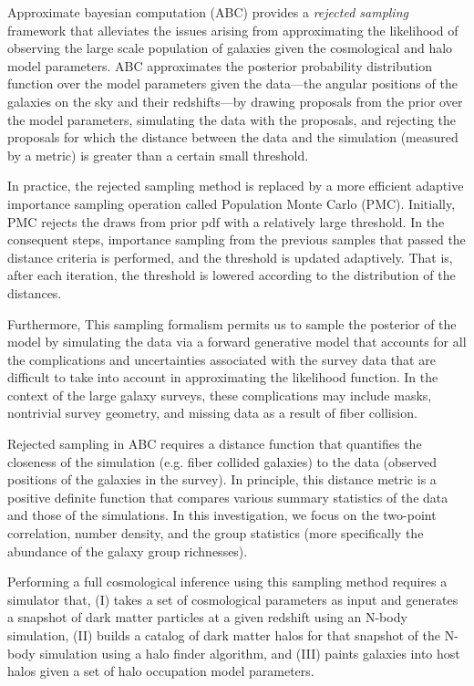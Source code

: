 \documentclass[12pt, preprint]{aastex}
\begin{document}
Approximate bayesian computation (ABC) provides a \emph{rejected sampling} framework that alleviates the issues arising from approximating the likelihood of observing the large scale population of galaxies given the cosmological and halo model parameters. ABC approximates the posterior probability distribution function over the model parameters given the data---the angular positions of the galaxies on the sky and their redshifts---by drawing proposals from the prior over the model parameters, simulating the data with the proposals, and rejecting the proposals for which the distance between the data and the simulation (measured by a metric) is greater than a certain small threshold.

In practice, the rejected sampling method is replaced by a more efficient adaptive importance sampling operation called Population Monte Carlo (PMC). Initially, PMC rejects the draws from prior pdf with a relatively large threshold. In the consequent steps, importance sampling from the previous samples that passed the distance criteria is performed, and the threshold is updated adaptively. That is, after each iteration, the threshold is lowered according to the distribution of the distances.  
 
Furthermore, This sampling formalism permits us to sample the posterior of the model by simulating the data via a forward generative model that accounts for all the complications and uncertainties associated with the survey data that are difficult to take into account in approximating the likelihood function. In the context of the large galaxy surveys, these complications may include masks, nontrivial survey geometry, and missing data as a result of fiber collision.

Rejected sampling in ABC requires a distance function that quantifies the closeness of the simulation (e.g. fiber collided galaxies) to the data (observed positions of the galaxies in the survey). In principle, this distance metric is a positive definite function  that compares various summary statistics of the data and those of the simulations. In this investigation, we focus on the two-point correlation, number density, and the group statistics (more specifically the abundance of the galaxy group richnesses). 

Performing a full cosmological inference using this sampling method requires a simulator that, (I) takes a set of cosmological parameters as input and generates a snapshot of dark matter particles at a given redshift using an N-body simulation, (II) builds a catalog of dark matter halos for that snapshot of the N-body simulation using a halo finder algorithm, and (III) paints galaxies into host halos given a set of halo occupation model parameters. 
\end{document}

